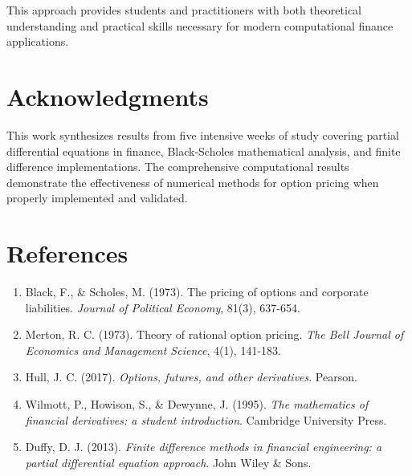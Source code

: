 \documentclass[12pt,a4paper]{article}
\numberwithin{algorithm}{subsection}
\begin{document}
This approach provides students and practitioners with both theoretical understanding and practical skills necessary for modern computational finance applications.

\section*{Acknowledgments}

This work synthesizes results from five intensive weeks of study covering partial differential equations in finance, Black-Scholes mathematical analysis, and finite difference implementations. The comprehensive computational results demonstrate the effectiveness of numerical methods for option pricing when properly implemented and validated.

\section*{References}

\begin{enumerate}
\item Black, F., \& Scholes, M. (1973). The pricing of options and corporate liabilities. \textit{Journal of Political Economy}, 81(3), 637-654.
\item Merton, R. C. (1973). Theory of rational option pricing. \textit{The Bell Journal of Economics and Management Science}, 4(1), 141-183.
\item Hull, J. C. (2017). \textit{Options, futures, and other derivatives}. Pearson.
\item Wilmott, P., Howison, S., \& Dewynne, J. (1995). \textit{The mathematics of financial derivatives: a student introduction}. Cambridge University Press.
\item Duffy, D. J. (2013). \textit{Finite difference methods in financial engineering: a partial differential equation approach}. John Wiley \& Sons.
\end{enumerate}
\end{document}
